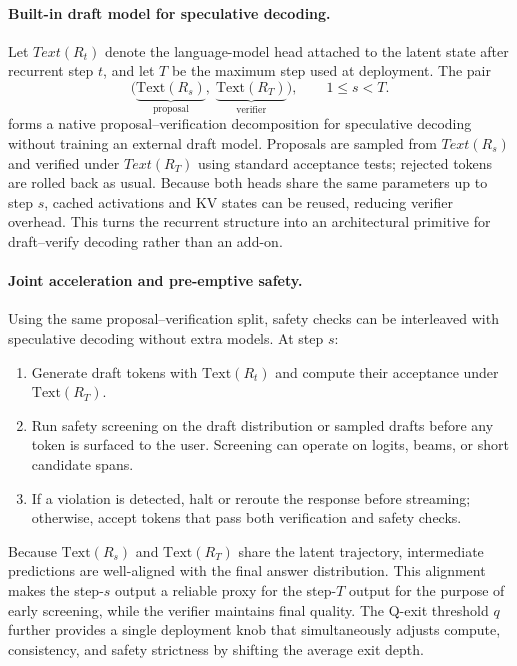\documentclass[]{bytedance_seed}
\newcommand{\1}{\mathbf{1}}
\begin{document}
{\paragraph{Built-in draft model for speculative decoding.}
Let $Text(R_t)$ denote the language-model head attached to the latent state after recurrent step $t$, and let $T$ be the maximum step used at deployment. The pair
\[
\bigl(\underbrace{\text{Text}(R_s)}_{\text{proposal}},\;
\underbrace{\text{Text}(R_T)}_{\text{verifier}}\bigr),\qquad 1\le s<T.
\]
forms a native proposal–verification decomposition for speculative decoding without training an external draft model. Proposals are sampled from $Text(R_s)$ and verified under $Text(R_T)$ using standard acceptance tests; rejected tokens are rolled back as usual. Because both heads share the same parameters up to step $s$, cached activations and KV states can be reused, reducing verifier overhead. This turns the recurrent structure into an architectural primitive for draft–verify decoding rather than an add-on.

\paragraph{Joint acceleration and pre-emptive safety.}
Using the same proposal–verification split, safety checks can be interleaved with speculative decoding without extra models. At step $s$:
\begin{enumerate}[leftmargin=1.2em,itemsep=0pt,topsep=2pt]
\item Generate draft tokens with $\text{Text}(R_t)$ and compute their acceptance under $\text{Text}(R_T)$.
\item Run safety screening on the draft distribution or sampled drafts before any token is surfaced to the user. Screening can operate on logits, beams, or short candidate spans.
\item If a violation is detected, halt or reroute the response before streaming; otherwise, accept tokens that pass both verification and safety checks.
\end{enumerate}
Because $\text{Text}(R_s)$ and $\text{Text}(R_T)$ share the latent trajectory, intermediate predictions are well-aligned with the final answer distribution. This alignment makes the step-$s$ output a reliable proxy for the step-$T$ output for the purpose of early screening, while the verifier maintains final quality. The Q-exit threshold $q$ further provides a single deployment knob that simultaneously adjusts compute, consistency, and safety strictness by shifting the average exit depth.



}
\end{document}
